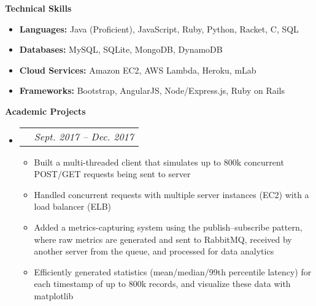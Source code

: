 \documentclass[letterpaper,11pt]{article}
\makeatletter
\newcommand{\resitem}[1]{\item #1 \vspace{-2pt}}
\newcommand{\resheading}[1]{{\large \colorbox{mygrey}{\begin{minipage}{\textwidth}{\textbf{#1 \vphantom{p\^{E}}}}\end{minipage}}}}
\newcommand{\ressubheadingproj}[4]{
\begin{tabular*}{6.5in}{l@{\extracolsep{\fill}}r}
    \textbf{#1} & \textit{#2} \\
\end{tabular*}\vspace{-6pt}}
\makeatother
\begin{document}
{    \resheading{Technical Skills}

    \begin{itemize}
        \item {
        \textbf{Languages:}
        \vspace{-0.2cm}
        Java (Proficient), JavaScript, Ruby, Python, Racket, C, SQL
        }
        \item {
        \textbf{Databases:}
        \vspace{-0.2cm}
        MySQL, SQLite, MongoDB, DynamoDB
        }
        \item {
        \textbf{Cloud Services:}
        \vspace{-0.2cm}
        Amazon EC2, AWS Lambda, Heroku, mLab
        }
        \item {
        \textbf{Frameworks:}
        Bootstrap, AngularJS, Node/Express.js, Ruby on Rails
        }
    \end{itemize}


    \resheading{Academic Projects}

    \begin{itemize}
        \item\ressubheadingproj
        {\href
        {https://github.com/jeremylinlin/cs6650-scalable-distributed-systems}
        {Distributed Ski Data Processing Engine}
        }
        {Sept. 2017 -- Dec. 2017}
        {}{}  %
        {\footnotesize
        \begin{itemize}
            \resitem
            {Built a multi-threaded client that simulates up to 800k concurrent POST/GET
            requests being sent to server}
            \resitem
            {Handled concurrent requests with multiple server instances (EC2)
            with a load balancer (ELB)}
            \resitem
            {Added a metrics-capturing system using the publish--subscribe pattern, where
            raw metrics are generated and sent to RabbitMQ, received by another server
            from the queue, and processed for data analytics}
            \resitem
            {Efficiently generated statistics (mean/median/99th percentile latency) for
            each timestamp of up to 800k records, and visualize these data with matplotlib}


\end{itemize}}
\end{itemize}}
\end{document}
